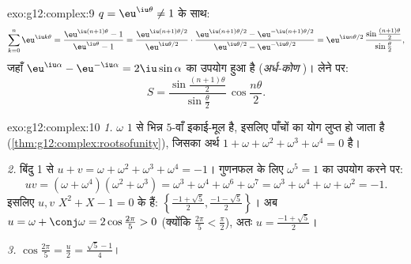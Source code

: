 \begin{solution}{exo:g12:complex:9}
$q = \eu^{\iu\theta} \neq 1$ के साथ:
\[
\sum_{k=0}^{n} \eu^{\iu k\theta} = \frac{\eu^{\iu(n+1)\theta} - 1}{\eu^{\iu\theta} - 1}
= \frac{\eu^{\iu(n+1)\theta/2}}{\eu^{\iu\theta/2}}
\cdot\frac{\eu^{\iu(n+1)\theta/2} - \eu^{-\iu(n+1)\theta/2}}{\eu^{\iu\theta/2} - \eu^{-\iu\theta/2}}
= \eu^{\iu n\theta/2}\,
\frac{\sin\frac{(n+1)\theta}{2}}{\sin\frac{\theta}{2}},
\]
जहाँ $\eu^{\iu\alpha} - \eu^{-\iu\alpha} = 2\iu\sin\alpha$ का उपयोग हुआ है (\emph{अर्ध-कोण })।  लेने पर:
\[
S = \frac{\sin\frac{(n+1)\theta}{2}}{\sin\frac{\theta}{2}}\,
\cos\frac{n\theta}{2}.
\]
\end{solution}

\begin{solution}{exo:g12:complex:10}
\emph{1.} $\omega$ $1$ से भिन्न $5$-वाँ इकाई-मूल है, इसलिए पाँचों  का योग
लुप्त हो जाता है (\cref{thm:g12:complex:rootsofunity}), जिसका अर्थ $1 + \omega + \omega^2 + \omega^3 + \omega^4 = 0$ है।

\emph{2.} बिंदु 1 से $u + v = \omega + \omega^2 + \omega^3 + \omega^4 = -1$। गुणनफल के लिए $\omega^5 = 1$ का उपयोग करने पर:
\[
uv = (\omega + \omega^4)(\omega^2 + \omega^3)
= \omega^3 + \omega^4 + \omega^6 + \omega^7
= \omega^3 + \omega^4 + \omega + \omega^2 = -1 .
\]
इसलिए $u, v$ $X^2 + X - 1 = 0$ के  हैं: $\left\{\frac{-1+\sqrt5}{2}, \frac{-1-\sqrt5}{2}\right\}$। अब $u = \omega + \conj\omega = 2\cos\frac{2\pi}{5} > 0$ (क्योंकि $\frac{2\pi}{5} < \frac{\pi}{2}$), अतः $u = \frac{-1 + \sqrt5}{2}$।

\emph{3.} $\cos\frac{2\pi}{5} = \frac u2 = \frac{\sqrt5 - 1}{4}$।
\end{solution}

